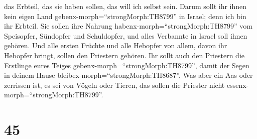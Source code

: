 das Erbteil, das sie haben sollen, das will ich selbst sein. Darum sollt
ihr ihnen kein eigen Land gebenx-morph=``strongMorph:TH8799'' in Israel;
denn ich bin ihr Erbteil.  Sie sollen ihre Nahrung
habenx-morph=``strongMorph:TH8799'' vom Speisopfer, Sündopfer und
Schuldopfer, und alles Verbannte in Israel soll ihnen gehören.
 Und alle ersten Früchte und alle Hebopfer von allem, davon
ihr Hebopfer bringt, sollen den Priestern gehören. Ihr sollt auch den
Priestern die Erstlinge eures Teiges
gebenx-morph=``strongMorph:TH8799'', damit der Segen in deinem Hause
bleibex-morph=``strongMorph:TH8687''.  Was aber ein Aas
oder zerrissen ist, es sei von Vögeln oder Tieren, das sollen die
Priester nicht essenx-morph=``strongMorph:TH8799''.

\hypertarget{section-44}{%
\section{45}\label{section-44}}

